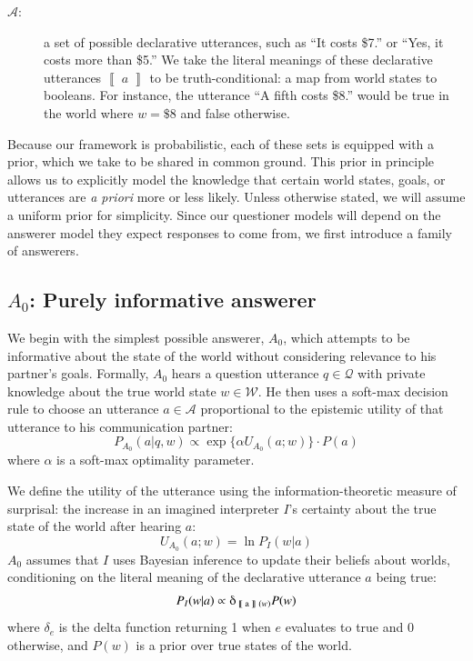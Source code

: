 \documentclass[11pt, floatsintext]{apa6}
\newcommand{\den}[2][]{
\(
\left\llbracket\;\text{#2}\;\right\rrbracket^{#1}
\)
}
\begin{document}
\begin{description}
\item[$\mathcal{A}$:] a set of possible declarative utterances, such as ``It costs \$7.'' or ``Yes, it costs more than \$5.'' We take the literal meanings of these declarative utterances \den{$a$} to be truth-conditional: a map from world states to booleans. For instance, the utterance ``A fifth costs \$8.'' would be true in the world where $w = \$8$ and false otherwise. 
\end{description}

Because our framework is probabilistic, each of these sets is equipped with a prior, which we take to be shared in common ground.
This prior in principle allows us to explicitly model the knowledge that certain world states, goals, or utterances are \emph{a priori} more or less likely. 
Unless otherwise stated, we will assume a uniform prior for simplicity.
Since our questioner models will depend on the answerer model they expect responses to come from, we first introduce a family of answerers.

\subsection{$A_0$: Purely informative answerer}

We begin with the simplest possible answerer, $A_0$, which attempts to be informative about the state of the world without considering relevance to his partner's goals. 
Formally, $A_0$ hears a question utterance $q \in \mathcal{Q}$ with private knowledge about the true world state $w \in \mathcal{W}$. 
He then uses a soft-max decision rule to choose an utterance $a \in \mathcal{A}$ proportional to the epistemic utility of that utterance to his communication partner: 
$$P_{A_0}(a | q, w) \propto \exp\{\alpha U_{A_0}(a;w)\}\cdot P(a)$$ 
where $\alpha$ is a soft-max optimality parameter. 

We define the utility of the utterance using the information-theoretic measure of surprisal: the increase in an imagined interpreter $I$'s certainty about the true state of the world after hearing $a$: 
\begin{equation}
\label{eq:A0utility}
U_{A_0}(a;w) = \ln P_I(w|a) 
\end{equation}
$A_0$ assumes that $I$ uses Bayesian inference to update their beliefs about worlds, conditioning on the literal meaning of the declarative utterance $a$ being true:
$$P_I(w|a) \propto \delta_{\textrm{\den{a}}(w)} P(w)$$
where $\delta_{e}$ is the delta function returning 1 when $e$ evaluates to true and 0 otherwise, and $P(w)$ is a prior over true states of the world. 
\end{document}
